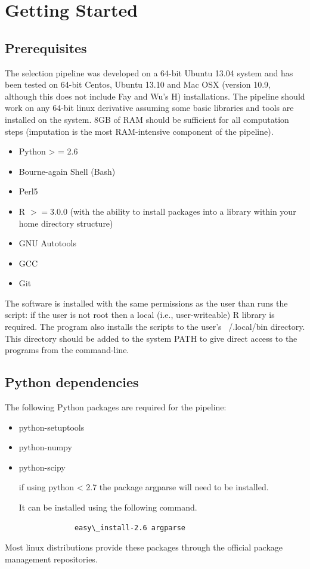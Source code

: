 \documentclass[a4paper,10pt]{article}
\begin{document}
        \section{Getting Started}
        \subsection{Prerequisites}
        The selection pipeline was developed on a 64-bit Ubuntu 13.04 system
        and has been tested on 64-bit Centos, Ubuntu 13.10 and Mac OSX (version 10.9, although this does not include Fay and Wu's H)
        installations. The pipeline should work on any 64-bit linux derivative
        assuming some basic libraries and tools are installed on the
        system. 8GB of RAM should be sufficient for all computation steps
        (imputation is the most RAM-intensive component of the pipeline).
        \begin{itemize}
        \item Python > = 2.6 
        \item Bourne-again Shell (Bash)
        \item Perl5
        \item R \( >= 3.0.0 \) (with the ability to install packages into a
          library within your home directory structure)
        \item GNU Autotools
        \item GCC 
        \item Git
        \end{itemize}
        The software is installed with the same permissions as the user than
        runs the script: if the user is not root then a local (i.e.,
        user-writeable) R library is
        required. The program also installs the scripts to the user's
        ~/.local/bin directory.  This directory should be added to the system
        PATH to give direct access to the programs from the command-line. 
         
         \subsection{Python dependencies}
         The following Python packages are required for the pipeline:
         \begin{itemize}
         \item python-setuptools
         \item python-numpy
         \item python-scipy

         if using python < 2.7 the package argparse will need to be installed.

             It can be installed using the following command.

             \begin{verbatim}
             easy\_install-2.6 argparse
             \end{verbatim}
             \end{itemize}
             Most linux distributions provide these packages through the official
             package management repositories.
\end{document}
